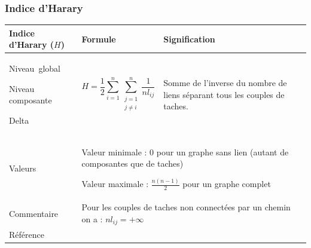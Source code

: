 \documentclass{article}
\begin{document}
\subsubsection{Indice d’Harary}
\label{metric_H}
\begin{table}[H]
\begin{tabular}{|m{3.24cm}|m{4.4810004cm}m{7.924cm}|}

\hline
Indice d’Harary ($H$) &
\multicolumn{1}{m{4.4810004cm}|}{Formule} &
Signification\\\hline
Niveau~global  

Niveau composante 

Delta &
\multicolumn{1}{m{4.4810004cm}|}{\begin{equation*}
H=\frac{1}{2}\sum _{i=1}^{n}{\sum _{\begin{matrix}j=1\\j{\neq}i\end{matrix}}^{n}{\frac{1}{{\mathit{nl}}_{\mathit{ij}}}}}
\end{equation*}
} &
Somme de l’inverse du nombre de liens séparant tous les couples de taches.

\\\hline
Valeurs &
\multicolumn{2}{m{12.6050005cm}|}{Valeur minimale : 0 pour un graphe sans lien (autant de composantes que de taches)

Valeur maximale : $\frac{n(n-1)}{2}$ pour un graphe complet

}\\\hline
Commentaire &
\multicolumn{2}{m{12.6050005cm}|}{Pour les couples de taches non connectées par un chemin on a :   ${\mathit{nl}}_{\mathit{ij}}=+{\infty}$}\\\hline
Référence &
\multicolumn{2}{m{12.6050005cm}|}{\cite{Ricotta2000}}\\\hline
\end{tabular}
\end{table}
\end{document}
